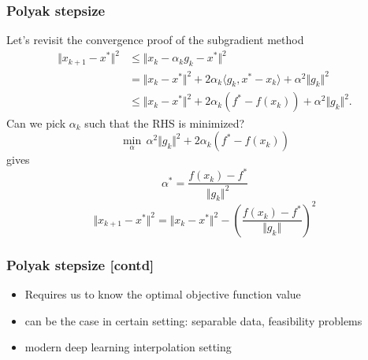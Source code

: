 \documentclass{beamer}
\begin{document}
\begin{frame}
  \frametitle{Polyak stepsize}
  Let's revisit the convergence proof of the subgradient method
  \begin{equation}
    \begin{aligned}
      \Vert x_{k+1} - x^* \Vert^2 &\le \Vert x_k - \alpha_k g_k - x^* \Vert^2 \\
      &= \Vert x_k-x^* \Vert^2 + 2 \alpha_k \langle g_k, x^*-x_k \rangle + \alpha^2 \Vert g_k \Vert^2\\
      &\le \Vert x_k-x^* \Vert^2 + 2 \alpha_k (f^* - f(x_k))+ \alpha^2 \Vert g_k \Vert^2.
    \end{aligned}
  \end{equation}
  Can we pick $\alpha_k$ such that the RHS is minimized?
  \begin{equation}
    \min_\alpha \, \alpha^2 \Vert g_k \Vert^2 + 2 \alpha_k (f^* - f(x_k))
  \end{equation}
  gives
  \begin{equation}
    \alpha^* = \frac{f(x_k)-f^*}{\Vert g_k \Vert^2}
  \end{equation}
  \begin{equation}
      \Vert x_{k+1} - x^* \Vert^2 = \Vert x_k-x^* \Vert^2 - {\left( \frac{f(x_k)-f^*}{\Vert g_k \Vert} \right)}^2
  \end{equation}
\end{frame}

\begin{frame}
  \frametitle{Polyak stepsize [contd]}
  \textit{}
  \begin{itemize}
    \item Requires us to know the optimal objective function value
    \item can be the case in certain setting:
          separable data, feasibility problems
    \item modern deep learning interpolation setting
  \end{itemize}

\end{frame}

\end{document}
